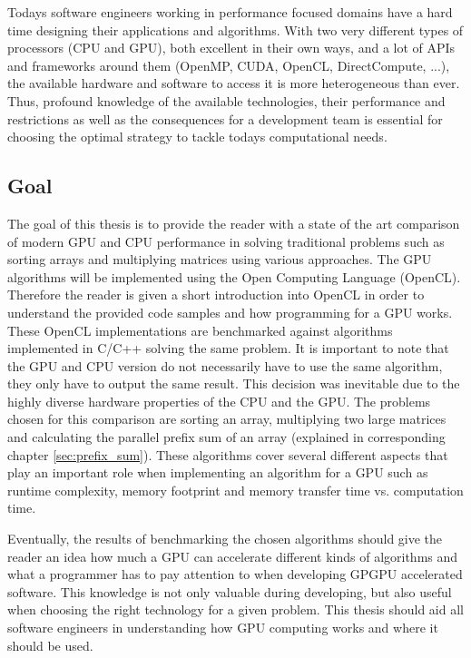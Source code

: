 Todays software engineers working in performance focused domains have a hard time designing their applications and algorithms. With two very different types of processors (CPU and GPU), both excellent in their own ways, and a lot of APIs and frameworks around them (OpenMP, CUDA, OpenCL, DirectCompute, ...), the available hardware and software to access it is more heterogeneous than ever. Thus, profound knowledge of the available technologies, their performance and restrictions as well as the consequences for a development team is essential for choosing the optimal strategy to tackle todays computational needs.

\subsection{Goal}
The goal of this thesis is to provide the reader with a state of the art comparison of modern GPU and CPU performance in solving traditional problems such as sorting arrays and multiplying matrices using various approaches.
The GPU algorithms will be implemented using the Open Computing Language (OpenCL). Therefore the reader is given a short introduction into OpenCL in order to understand the provided code samples and how programming for a GPU works. These OpenCL implementations are benchmarked against algorithms implemented in C/C++ solving the same problem. It is important to note that the GPU and CPU version do not necessarily have to use the same algorithm, they only have to output the same result. This decision was inevitable due to the highly diverse hardware properties of the CPU and the GPU.
The problems chosen for this comparison are sorting an array, multiplying two large matrices and calculating the parallel prefix sum of an array (explained in corresponding chapter \ref{sec:prefix_sum}). These algorithms cover several different aspects that play an important role when implementing an algorithm for a GPU such as runtime complexity, memory footprint and memory transfer time vs. computation time. 

Eventually, the results of benchmarking the chosen algorithms should give the reader an idea how much a GPU can accelerate different kinds of algorithms and what a programmer has to pay attention to when developing GPGPU accelerated software. This knowledge is not only valuable during developing, but also useful when choosing the right technology for a given problem. This thesis should aid all software engineers in understanding how GPU computing works and where it should be used.

